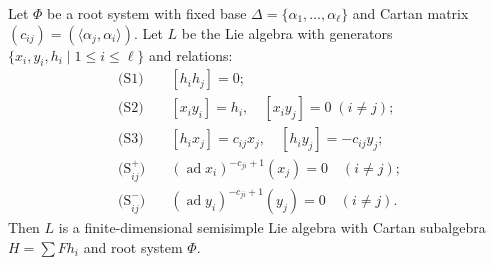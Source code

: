 Let $\Phi$ be a root system with fixed base $\Delta = \{\alpha_1, \ldots, \alpha_\ell\}$ and Cartan matrix $(c_{ij}) = (\langle \alpha_j, \alpha_i \rangle)$. Let $L$ be the Lie algebra with generators $\{x_i, y_i, h_i \mid 1 \leq i \leq \ell\}$ and relations:
\begin{align*}
\text{(S1)} &\quad [h_i h_j] = 0;\\
\text{(S2)} &\quad [x_i y_i] = h_i, \quad [x_i y_j] = 0 \; (i \neq j);\\
\text{(S3)} &\quad [h_i x_j] = c_{ij} x_j, \quad [h_i y_j] = -c_{ij} y_j;\\
\text{(S}_{ij}^+) &\quad (\operatorname{ad} x_i)^{-c_{ji}+1}(x_j) = 0 \quad (i \neq j);\\
\text{(S}_{ij}^-) &\quad (\operatorname{ad} y_i)^{-c_{ji}+1}(y_j) = 0 \quad (i \neq j).
\end{align*}
Then $L$ is a finite-dimensional semisimple Lie algebra with Cartan subalgebra $H = \sum F h_i$ and root system $\Phi$.
